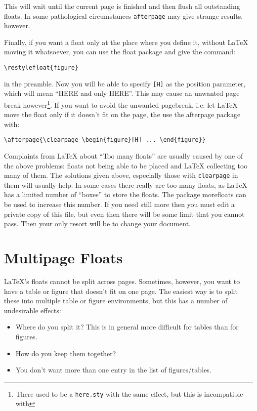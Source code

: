 \documentclass[a4paper]{article}
\def\latex/{\protect\LaTeX{}}
\newcommand{\bs}{\symbol{'134}}
\newcommand{\Cmd}[1]{\texttt{\def\{{\char`\{}\def\}{\char`\}}\bs#1}}
\begin{document}
This will wait until the current page is finished and then flush all
outstanding floats. In some pathological circumstances \texttt{afterpage}
may give strange results, however.

Finally, if you want a float only at the place where you define it, without
\latex/ moving it whatsoever, you can use the \textsf{float} package and
give the command:
\begin{verbatim}
\restylefloat{figure}
\end{verbatim}
 in the preamble. Now you will be able to
specify \texttt{[H]} as the position parameter, which will mean ``HERE and only
HERE''. This may cause an unwanted page break however\footnote{There used
to be a \texttt{here.sty} with the same effect, but this is incompatible
with \LaTeXe}. If you want to avoid the unwanted pagebreak, i.e. let
\LaTeX{} move the float only if it doesn't fit on the page, the use the
\textsf{afterpage} package with:
\begin{verbatim}
\afterpage{\clearpage \begin{figure}[H] ... \end{figure}}
\end{verbatim}

Complaints from \latex/ about ``Too many floats'' are usually caused by one
of the above problems: floats not being able to be placed and \latex/
collecting too many of them. The solutions given above, especially those
with \Cmd{clearpage} in them will usually help. In some cases there
really are too many floats, as \latex/ has a limited number of ``boxes'' to
store the floats. The package \textsf{morefloats} can be used to increase
this number. If you need still more then you must edit a private copy of
this file, but even then there will be some limit that you cannot pass.
Then your only resort will be to change your document.

\section{Multipage Floats}

\LaTeX's floats cannot be split across pages. Sometimes, however, you want
to have a table or figure that doesn't fit on one page. The easiest way is
to split these into multiple table or figure environments, but this has a
number of undesirable effects:
\begin{itemize}
\item Where do you split it? This is in general more difficult for tables
  than for figures.
\item How do you keep them together?
\item You don't want more than one entry in the list of figures/tables.
\end{itemize}
\end{document}
